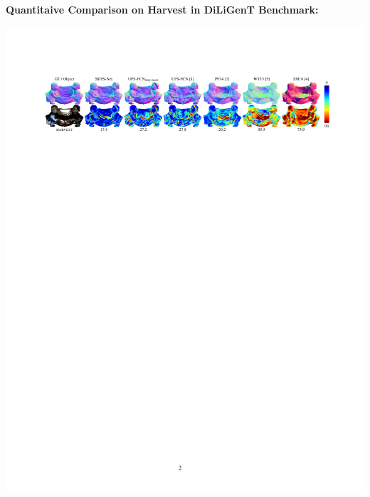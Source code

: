 \documentclass[landscape,a0paper,fontscale=0.292]{baposter}
\begin{document}
\begin{poster}
{    \textbf{\color{blue}Quantitaive Comparison on {\sc Harvest} in DiLiGenT Benchmark:} \\
    \begin{center}
        \vspace{-0.6cm}
        \includegraphics[width=\textwidth]{images/qual_diligent_harvest.pdf}
    \end{center}

}
\end{poster}
\end{document}
